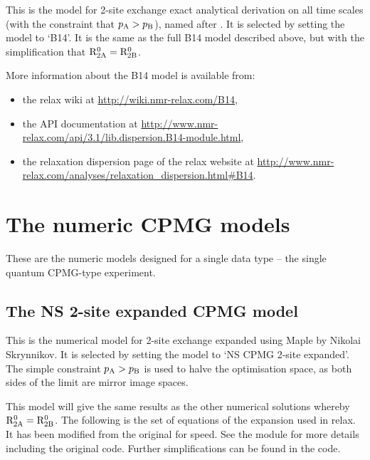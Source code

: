 This is the model for 2-site exchange exact analytical derivation on all time scales (with the constraint that $p_\textrm{A} > p_\textrm{B}$), named after \citet{Baldwin2014}.
It is selected by setting the model to `B14'.
It is the same as the full B14 model described above, but with the simplification that $\mathrm{R}_\mathrm{2A}^0 = \mathrm{R}_\mathrm{2B}^0$.

More information about the B14 model is available from:
\begin{itemize}
  \item the relax wiki at \url{http://wiki.nmr-relax.com/B14},
  \item the API documentation at \url{http://www.nmr-relax.com/api/3.1/lib.dispersion.B14-module.html},
  \item the relaxation dispersion page of the relax website at \url{http://www.nmr-relax.com/analyses/relaxation\_dispersion.html#B14}.
\end{itemize}



\section{The numeric CPMG models}
\label{sect: dispersion: numeric CPMG models}

These are the numeric models designed for a single data type -- the single quantum CPMG-type experiment.



\subsection{The NS 2-site expanded CPMG model}
\label{sect: dispersion: NS CPMG 2-site expanded model}

This is the numerical model for 2-site exchange expanded using Maple by Nikolai Skrynnikov.
It is selected by setting the model to `NS CPMG 2-site expanded'.
The simple constraint $p_\textrm{A} > p_\textrm{B}$ is used to halve the optimisation space, as both sides of the limit are mirror image spaces.

This model will give the same results as the other numerical solutions whereby $\mathrm{R}_\mathrm{2A}^0 = \mathrm{R}_\mathrm{2B}^0$.
The following is the set of equations of the expansion used in relax.
It has been modified from the original for speed.
See the  module for more details including the original code.
Further simplifications can be found in the code.

